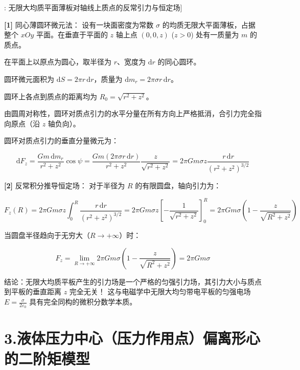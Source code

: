 \documentclass[11pt,a4paper,UTF8]{ctexart}
\begin{document}
\begin{thmbox}[模型[4]: 无限大均质平面薄板对轴线上质点的反常引力与恒定场]

\textbf{[1]} 同心薄圆环微元法：
设有一块面密度为常数 $\sigma$ 的均质无限大平面薄板，占据整个 $xOy$ 平面。在垂直于平面的 $z$ 轴上点 $(0, 0, z)$ ($z > 0$) 处有一质量为 $m$ 的质点。

在平面上以原点为圆心，取半径为 $r$、宽度为 $\mathrm{d}r$ 的同心圆环。

圆环微元面积为 $\mathrm{d}S = 2\pi r\,\mathrm{d}r$，质量为 $\mathrm{d}m_r = 2\pi \sigma r\,\mathrm{d}r$。

圆环上各点到质点的距离均为 $R_0 = \sqrt{r^2 + z^2}$。

由圆周对称性，圆环对质点引力的水平分量在所有方向上严格抵消，合引力完全指向原点（沿 $z$ 轴负向）。

圆环对质点引力的垂直分量微元为：


\begin{equation*}
\mathrm{d}F_z = \frac{G m\,\mathrm{d}m_r}{r^2 + z^2} \cos\psi = \frac{G m (2\pi \sigma r\,\mathrm{d}r)}{r^2 + z^2} \frac{z}{\sqrt{r^2 + z^2}} = 2\pi G m \sigma z \frac{r\,\mathrm{d}r}{(r^2 + z^2)^{3/2}}
\end{equation*}


\textbf{[2]} 反常积分推导恒定场：
对于半径为 $R$ 的有限圆盘，轴向引力为：


\begin{equation*}
F_z(R) = 2\pi G m \sigma z \int_0^R \frac{r\,\mathrm{d}r}{(r^2 + z^2)^{3/2}} = 2\pi G m \sigma z \left[-\frac{1}{\sqrt{r^2 + z^2}}\right]_0^R = 2\pi G m \sigma \left(1 - \frac{z}{\sqrt{R^2 + z^2}}\right)
\end{equation*}


当圆盘半径趋向于无穷大（$R \to +\infty$）时：


\begin{equation*}
F_z = \lim_{R \to +\infty} 2\pi G m \sigma \left(1 - \frac{z}{\sqrt{R^2 + z^2}}\right) = 2\pi G m \sigma
\end{equation*}


结论：\textit{}无限大均质平板产生的引力场是一个严格的匀强引力场，其引力大小与质点到平板的垂直距离 $z$ 完全无关！\textit{} 这与电磁学中无限大均匀带电平板的匀强电场 $E = \frac{\sigma}{2\varepsilon_0}$ 具有完全同构的微积分数学本质。

\end{thmbox}

\section{3.液体压力中心（压力作用点）偏离形心的二阶矩模型}
\end{document}
